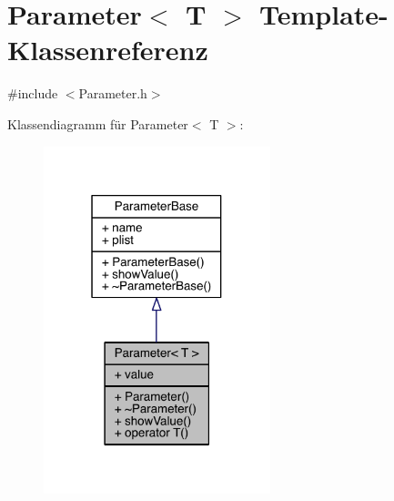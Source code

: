 \hypertarget{class_parameter}{}\section{Parameter$<$ T $>$ Template-\/\+Klassenreferenz}
\label{class_parameter}


{\ttfamily \#include $<$Parameter.\+h$>$}



Klassendiagramm für Parameter$<$ T $>$\+:
\nopagebreak
\begin{figure}[H]
\begin{center}
\leavevmode
\includegraphics[width=187pt]{class_parameter__inherit__graph}
\end{center}
\end{figure}


